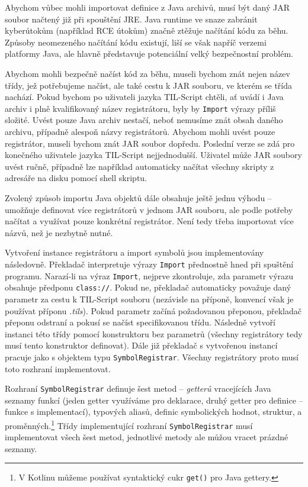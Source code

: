 Abychom vůbec mohli importovat definice z Java archivů, musí být daný JAR soubor načtený již při
spouštění JRE. Java runtime ve snaze zabránit kyberútokům (například RCE útokům) značně ztěžuje
načítání kódu za běhu. Způsoby neomezeného načítání kódu existují, liší se však napříč verzemi
platformy Java, ale hlavně představuje potenciální velký bezpečnostní problém.

Abychom mohli bezpečně načíst kód za běhu, museli bychom znát nejen název třídy, jež potřebujeme
načíst, ale také cestu k JAR souboru, ve kterém se třída nachází. Pokud bychom po uživateli jazyka
TIL-Script chtěli, ať uvádí i Java archiv i plně kvalifikovaný název registrátoru, byly by
\lstinline{Import} výrazy příliš složité. Uvést pouze Java archiv nestačí, neboť nemusíme znát obsah
daného archivu, případně alespoň názvy registrátorů. Abychom mohli uvést pouze registrátor, museli
bychom znát JAR soubor dopředu. Poslední verze se zdá pro konečného uživatele jazyka TIL-Script
nejjednodušší. Uživatel může JAR soubory uvést ručně, případně lze například automaticky načítat
všechny skripty z adresáře na disku pomocí shell skriptu.

Zvolený způsob importu Java objektů dále obsahuje ještě jednu výhodu -- umožňuje definovat více
registrátorů v jednom JAR souboru, ale podle potřeby načítat a využívat pouze konkrétní registrátor.
Není tedy třeba importovat více názvů, než je nezbytně nutné.

Vytvoření instance registrátoru a import symbolů jsou implementovány následovně. Překladač
interpretuje výrazy \lstinline{Import} přednostně hned při spuštění programu. Narazí-li na výraz
\lstinline{Import}, nejprve zkontroluje, zda parametr výrazu obsahuje předponu \lstinline{class://}.
Pokud ne, překladač automaticky považuje daný parametr za cestu k TIL-Script souboru (nezávisle
na příponě, konvencí však je používat příponu \textit{.tils}). Pokud parametr začíná požadovanou
přeponou, překladač přeponu odstraní a pokusí se načíst specifikovanou třídu. Následně vytvoří
instanci této třídy pomocí konstruktoru bez parametrů (všechny registrátory tedy musí tento
konstruktor definovat). Dále již překladač s vytvořenou instancí pracuje jako s objektem typu
\lstinline{SymbolRegistrar}. Všechny registrátory proto musí toto rozhraní implementovat.

Rozhraní \lstinline{SymbolRegistrar} definuje šest metod -- \textit{getterů} vracejících Java
seznamy funkcí (jeden getter využíváme pro deklarace, druhý getter pro definice -- funkce
s implementací), typových aliasů, definic symbolických hodnot, struktur, a proměnných.\footnote{
  V Kotlinu můžeme používat syntaktický cukr \lstinline{get()} pro Java gettery.}
Třídy implementující rozhraní \lstinline{SymbolRegistrar} musí implementovat všech šest metod,
jednotlivé metody ale můžou vracet prázdné seznamy.


